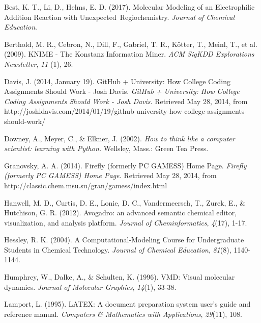 \documentclass[10pt,letterpaper]{article}
\begin{document}
\begin{thebibliography}{99}

 Best, K. T., Li, D., Helms, E. D. (2017).
 Molecular Modeling of an Electrophilic Addition Reaction with \grqq Unexpected\grqq\ Regiochemistry.
 \textit{Journal of Chemical Education}.

 Berthold, M. R., Cebron, N., Dill, F., Gabriel, T. R., K\"otter, T., Meinl, T., et al. (2009).
 KNIME - The Konstanz Information Miner.
 \textit{ACM SigKDD Explorations Newsletter},
 \textit{11} (1),
 26.

 Davis, J. (2014, January 19).
 GitHub + University: How College Coding Assignments Should Work - Josh Davis.
 \textit{GitHub + University: How College Coding Assignments Should Work - Josh Davis}.
 Retrieved May 28, 2014, from {\footnotesize http://joshldavis.com/2014/01/19/github-university-how-college-assignments-should-work/}

 Downey, A., Meyer, C., \& Elkner, J. (2002).
 \textit{How to think like a computer scientist: learning with Python.}
 Wellsley, Mass.:
 Green Tea Press.

 Granovsky, A. A. (2014).
 Firefly (formerly PC GAMESS) Home Page.
 \textit{Firefly (formerly PC GAMESS) Home Page.}
 Retrieved May 28, 2014, from {\footnotesize http://classic.chem.msu.su/gran/gamess/index.html}

 Hanwell, M. D., Curtis, D. E., Lonie, D. C., Vandermeersch, T., Zurek, E., \& Hutchison, G. R. (2012).
 Avogadro: an advanced semantic chemical editor, visualization, and analysis platform.
 \textit{Journal of Cheminformatics},
 \textit{4}(17),
 1-17.

 Hessley, R. K. (2004).
 A Computational-Modeling Course for Undergraduate Students in Chemical Technology.
 \textit{Journal of Chemical Education},
 \textit{81}(8),
 1140-1144.

 Humphrey, W., Dalke, A., \& Schulten, K. (1996).
 VMD: Visual molecular dynamics.
 \textit{Journal of Molecular Graphics},
 \textit{14}(1),
 33-38.

 Lamport, L. (1995).
 LATEX: A document preparation system user's guide and reference manual.
 \textit{Computers \& Mathematics with Applications},
 \textit{29}(11),
 108.


\end{thebibliography}
\end{document}
